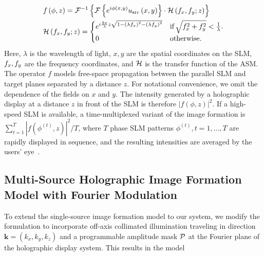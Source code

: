 \begin{equation}
\begin{split}
    & f \left(\phi, z \right) = \mathcal{F}^{-1} \left\{ \mathcal{F} \left\{ e^{i\phi \left(x, y \right)} u_\text{src} \left(x, y \right) \right\} \cdot \mathcal{H} \left(f_x, f_y; z \right) \right\} \\
    &\mathcal{H} \left(f_x, f_y; z \right) = \begin{cases}
    e^{i\frac{2\pi}{\lambda} z \sqrt{1- \left( \lambda f_x \right) ^2- \left( \lambda f_y \right) ^2} } & \text{if} \, \sqrt{f_x^2+f_y^2} < \frac{1}{\lambda}.\\
    0 & \text{otherwise}.
\end{cases}
\end{split}
\label{eq:asm}
\end{equation}
%
Here, $\lambda$ is the wavelength of light, $x, y$ are the spatial coordinates on the SLM, $f_x, f_y$ are the frequency coordinates, %
and $\mathcal{H}$ is the transfer function of the ASM. The operator $f$ models free-space propagation between the parallel SLM and target planes separated by a distance $z$. For notational convenience, we omit the dependence
of the fields on $x$ and $y$. The intensity generated by a holographic display at a distance $z$ in front of the SLM is therefore $\left| f \left(\phi, z \right) \right|^2$. If a high-speed SLM is available, a time-multiplexed variant of the image formation is $\sum_{t=1}^T \left| f \left(\phi^{(t)}, z \right) \right|^2 \!\! / T$, where $T$ phase SLM patterns $\phi^{(t)}, t = 1, \ldots, T$ are rapidly displayed in sequence, and the resulting intensities are averaged by the users' eye~\cite{choi2022flex}.


\subsection{Multi-Source Holographic Image Formation Model with Fourier Modulation}
To extend the single-source image formation model to our system, we modify the formulation to incorporate off-axis collimated illumination traveling in direction
$\mathbf{k} = (k_x, k_y, k_z)$ and a programmable amplitude mask $\mathcal{P}$ at the Fourier plane of the holographic display system. This results in the model

